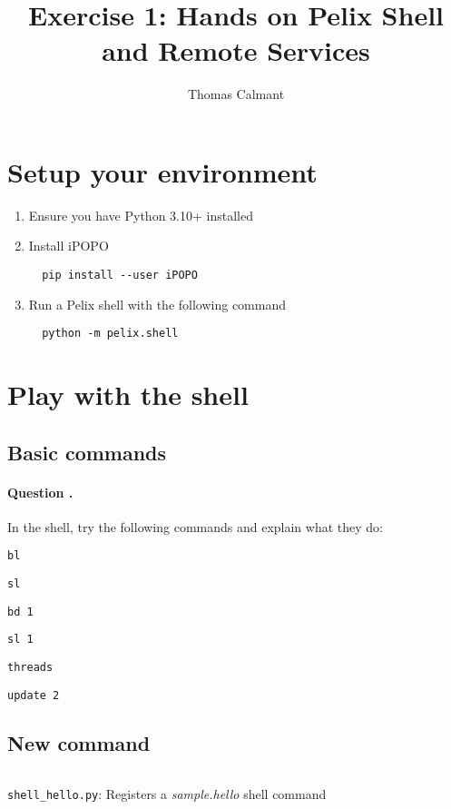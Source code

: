 \documentclass[a4paper, 12pt]{article}
\title{Exercise 1: Hands on Pelix Shell and Remote Services}
\author{Thomas Calmant}
\date{}
\newcounter{question}
\newcommand\Question{%
  \stepcounter{question}%
  \paragraph{\hspace{2ex} Question \thequestion.}
}
\let\tempone\itemize
\let\temptwo\enditemize
\renewenvironment{itemize}{\tempone\addtolength{\itemsep}{-.5em}}{\temptwo}
\begin{document}
\maketitle

\section{Setup your environment}

\begin{enumerate}
\item Ensure you have Python 3.10+ installed
\item Install iPOPO
\begin{verbatim}
  pip install --user iPOPO
\end{verbatim}
\item Run a Pelix shell with the following command
\begin{verbatim}
  python -m pelix.shell
\end{verbatim}
\end{enumerate}

\section{Play with the shell}

\subsection{Basic commands}

\Question In the shell, try the following commands and explain what they do:
\begin{itemize}
\item \texttt{bl}
\item \texttt{sl}
\item \texttt{bd 1}
\item \texttt{sl 1}
\item \texttt{threads}
\item \texttt{update 2}
\end{itemize}

\subsection{New command}

\begin{listing}[ht]
\inputminted[fontsize=\footnotesize, frame=lines, framesep=2mm, baselinestretch=1.2, bgcolor=LightGray, linenos]{python}{../shell_hello.py}
\caption{\texttt{shell\_hello.py}: Registers a \textit{sample.hello} shell command}
\label{code:shell_hello}
\end{listing}
\end{document}

